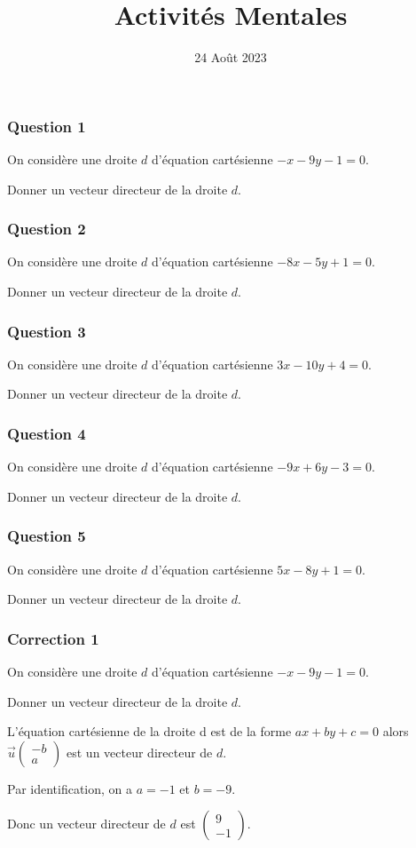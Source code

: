\documentclass[15pt, mathserif]{beamer}
\title{Activités Mentales}
\date{24 Août 2023}
\newcommand{\vco}[2]{\begin{pmatrix} #1 \\ #2 \end{pmatrix}} %
\begin{document}
\begin{frame}
    \titlepage
\end{frame}

\begin{frame} 
	\frametitle{Question 1}
On considère une droite $d$ d'équation cartésienne $-x-9y-1=0$. 
 
 Donner un vecteur directeur de la droite $d$.\end{frame}


\begin{frame} 
	\frametitle{Question 2}
On considère une droite $d$ d'équation cartésienne $-8x-5y+1=0$. 
 
 Donner un vecteur directeur de la droite $d$.\end{frame}


\begin{frame} 
	\frametitle{Question 3}
On considère une droite $d$ d'équation cartésienne $3x-10y+4=0$. 
 
 Donner un vecteur directeur de la droite $d$.\end{frame}


\begin{frame} 
	\frametitle{Question 4}
On considère une droite $d$ d'équation cartésienne $-9x+6y-3=0$. 
 
 Donner un vecteur directeur de la droite $d$.\end{frame}


\begin{frame} 
	\frametitle{Question 5}
On considère une droite $d$ d'équation cartésienne $5x-8y+1=0$. 
 
 Donner un vecteur directeur de la droite $d$.\end{frame}


\begin{frame}
\vspace{-10mm}
	\frametitle{Correction 1}
 On considère une droite $d$ d'équation cartésienne $-x-9y-1=0$. 
 
 Donner un vecteur directeur de la droite $d$. 
 
 \bigskip 
 
 L'équation cartésienne de la droite d est de la forme $ax + by + c = 0$ alors $\overrightarrow{u}\vco{-b}{a}$ est un vecteur directeur de $d$. 
 
 Par identification, on a $a=-1$ et $b=-9$. 
 
 Donc un vecteur directeur de $d$ est $\vco{9}{-1}$.\end{frame}
\end{document}
